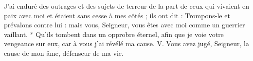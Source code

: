 J’ai enduré des outrages et des sujets de terreur de la part de ceux qui vivaient en paix avec moi et étaient sans cesse à mes côtés ; ils ont dit : Trompons-le et prévalons contre lui : mais vous, Seigneur, vous êtes avec moi comme un guerrier vaillant.
\versseparator
* Qu’ils tombent dans un opprobre éternel, afin que je voie votre vengeance sur eux, car à vous j’ai révélé ma cause.
\versseparator
V. Vous avez jugé, Seigneur, la cause de mon âme, défenseur de ma vie.
